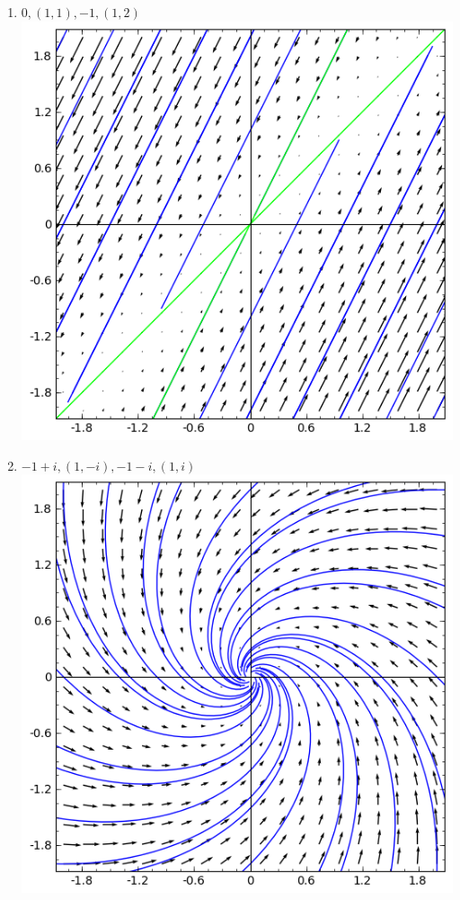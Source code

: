 {\begin{multicols}{2}
\begin{enumerate}
\begin{enumerate}
\item $0, (1,1),  -1, (1,2)$\\\includegraphics[width=\myvfwidth]{Applications/support/vfi}
\item $-1+i, (1,-i),  -1-i, (1,i)$\\\includegraphics[width=\myvfwidth]{Applications/support/vfj}
\end{enumerate}



\end{enumerate}
\end{multicols}}
